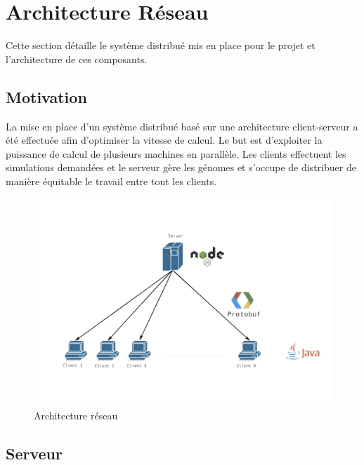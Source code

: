 \documentclass{article}
\begin{document}
\section{Architecture Réseau}

Cette section détaille le système distribué mis en place pour le projet et l'architecture de ces composants.

\subsection{Motivation}

La mise en place d'un système distribué basé sur une architecture client-serveur a été effectuée afin d'optimiser la vitesse de calcul. Le but est d'exploiter la puissance de calcul de plusieurs machines en parallèle. Les clients effectuent les simulations demandées et le serveur gère les génomes et s'occupe de distribuer de manière équitable le travail entre tout les clients.\\

\begin{figure}[H]
\begin{center}
	\includegraphics[scale=0.5]{archnet.png}
	\caption{Architecture réseau}
\end{center}
\end{figure}

\subsection{Serveur}
\end{document}
